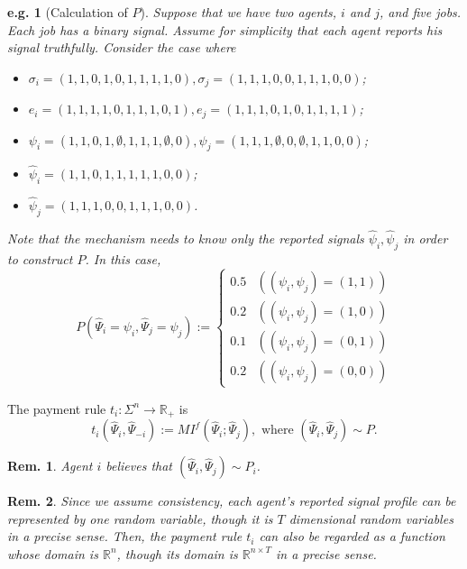 \documentclass[11pt,a4paper,dvipdfmx]{article}
\theoremstyle{plain}
\newtheorem{eg}{e.g.}[section]
\newtheorem{rem}{Rem.}[section]
\newcommand{\R}{\mathbb{R}}
\renewcommand{\hat}{\widehat}
\newcommand{\1}{\mathbbm{1}}
\begin{document}
\begin{screen}
\begin{eg}[Calculation of $P$]
	Suppose that we have two agents, $i$ and $j$, and five jobs. Each job has a binary signal. Assume for simplicity that each agent reports his signal truthfully.
	Consider the case where
	\begin{itemize}
		\item $\sigma_i = (1,1,0,1,0,1,1,1,1,0), \sigma_j = (1,1,1,0,0,1,1,1,0,0)$;
		\item $e_i = (1,1,1,1,0,1,1,1,0,1), e_j = (1,1,1,0,1,0,1,1,1,1)$;
		\item $\psi_i = (1,1,0,1,\emptyset,1,1,1,\emptyset,0), \psi_j = (1,1,1,\emptyset,0,\emptyset,1,1,0,0)$;
		\item $\hat{\psi}_i = (1,1,0,1,1,1,1,1,0,0)$;
		\item $\hat{\psi}_j = (1,1,1,0,0,1,1,1,0,0)$.
	\end{itemize}
	Note that the mechanism needs to know only the reported signals $\hat{\psi}_i, \hat{\psi}_j$ in order to construct $P$. In this case, 
	\[
	P(\hat{\Psi}_i = \psi_i, \hat{\Psi}_j = \psi_j) := \begin{cases}
		0.5 & ((\psi_i, \psi_j) = (1,1)) \\
		0.2 & ((\psi_i, \psi_j) = (1,0)) \\
		0.1 & ((\psi_i, \psi_j) = (0,1)) \\
		0.2 & ((\psi_i, \psi_j) = (0,0)) 
	\end{cases}
	\]
\end{eg}	
\end{screen}

The payment rule $t_i: \Sigma^{n} \to \R_+$ is
\[
t_i(\hat{\Psi}_{i}, \hat{\Psi}_{-i}) := MI^f(\hat{\Psi}_i ; \hat{\Psi}_j), \text{ where $(\hat{\Psi}_i, \hat{\Psi}_j) \sim P$}.
\]
\begin{rem}
	Agent $i$ believes that $(\hat{\Psi}_i, \hat{\Psi}_j) \sim P_i$.
\end{rem}
\begin{rem}
	Since we assume consistency, each agent's reported signal profile can be represented by one random variable, though it is $T$ dimensional random variables in a precise sense.	Then, the payment rule $t_i$ can also be regarded as a function whose domain is $\R^n$, though its domain is $\R^{n \times T}$ in a precise sense.
\end{rem}
\end{document}
